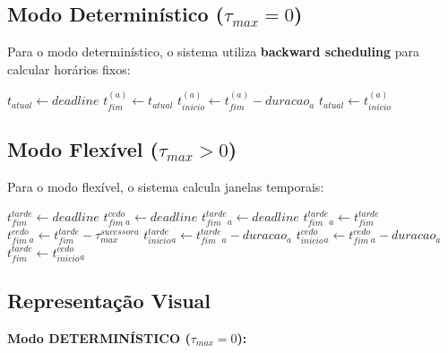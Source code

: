 \documentclass[12pt,a4paper]{article}
\begin{document}
\subsection{Modo Determinístico ($\tau_{max} = 0$)}

Para o modo determinístico, o sistema utiliza \textbf{backward scheduling} para calcular horários fixos:

\begin{algorithm}
\caption{Backward Scheduling (Determinístico)}
\begin{algorithmic}[1]
\State $t_{atual} \gets deadline$
    \State $t_{fim}^{(a)} \gets t_{atual}$
    \State $t_{inicio}^{(a)} \gets t_{fim}^{(a)} - duracao_a$
    \State $t_{atual} \gets t_{inicio}^{(a)}$
\EndFor
\end{algorithmic}
\end{algorithm}

\subsection{Modo Flexível ($\tau_{max} > 0$)}

Para o modo flexível, o sistema calcula janelas temporais:

\begin{algorithm}
\caption{Cálculo de Janelas Flexíveis}
\begin{algorithmic}[1]
\State $t_{fim}^{tarde} \gets deadline$
        \State $t_{fim}^{cedo}_a \gets deadline$
        \State $t_{fim}^{tarde}_a \gets deadline$
    \Else
        \State $t_{fim}^{tarde}_a \gets t_{fim}^{tarde}$
        \State $t_{fim}^{cedo}_a \gets t_{fim}^{tarde} - \tau_{max}^{sucessora}$
    \EndIf
    \State $t_{inicio}^{tarde}_a \gets t_{fim}^{tarde}_a - duracao_a$
    \State $t_{inicio}^{cedo}_a \gets t_{fim}^{cedo}_a - duracao_a$
    \State $t_{fim}^{tarde} \gets t_{inicio}^{cedo}_a$
\EndFor
\end{algorithmic}
\end{algorithm}

\subsection{Representação Visual}

\textbf{Modo DETERMINÍSTICO ($\tau_{max} = 0$):}
\begin{center}
\end{center}
\end{document}
